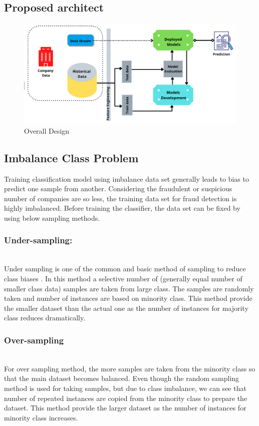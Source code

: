 \subsection{Proposed architect}\label{subsec:propsed-architech}
\begin{figure}[ht]
    \centering
    \includegraphics[width=\linewidth]{figures/overall_design.PNG}
    \caption{Overall Design}
    \label{fig:design}
\end{figure}


\subsection{Imbalance Class Problem}\label{subsec:imbalance-class-problem}
Training classification model using imbalance data set generally leads to bias to predict one sample from another. Considering the fraudulent or suspicious number of companies are so less, the training data set for fraud detection is highly imbalanced. Before training the classifier, the data set can be fixed by using below sampling methods.    
\subsubsection{Under-sampling:}\hspace*{\fill} \\
Under sampling is one of the common and basic method of sampling to reduce class biases \cite{10.1145/3055635.3056643}. In this method a selective number of (generally equal number of smaller class data) samples are taken from large class. The samples are randomly taken and number of instances are based on minority class. This method provide the smaller dataset than the actual one as the number of instances for majority class reduces dramatically. 
\subsubsection{Over-sampling}\hspace*{\fill} \\
For over sampling method, the more samples are taken from the minority class so that the main dataset becomes balanced. Even though the random sampling method is used for taking samples, but due to class imbalance, we can see that number of repeated instances are copied from the minority class to prepare the dataset. This method provide the larger dataset as the number of instances for minority class increases. 

